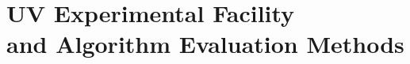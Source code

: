 \chapter{\acs{UV} Experimental Facility\\
           and Algorithm Evaluation Methods}
\label{appenJHUHTF}
\acresetall



%
